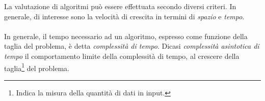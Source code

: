 \documentclass{subfiles}
\begin{document}
La valutazione di algoritmi può essere effettuata secondo diversi criteri. In generale, di interesse sono la velocità di crescita in termini di \emph{spazio} e \emph{tempo}.
\\ \\
In generale, il tempo necessario ad un algoritmo, espresso come funzione della taglia del problema, è detta \emph{complessità di tempo}.
Dicasi \emph{complessità asintotica di tempo} il comportamento limite della complessità di tempo, al crescere della taglia\footnote[1]{Indica la misura della quantità di dati in input.} del problema.
\end{document}
